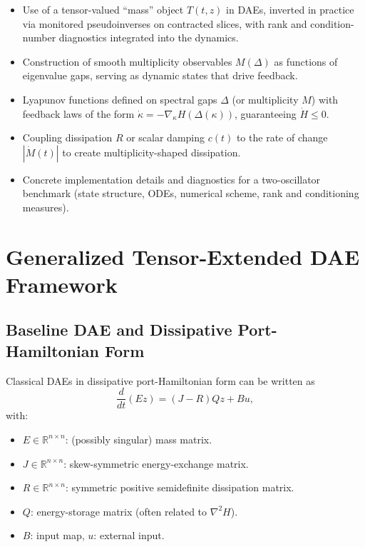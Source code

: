 \documentclass[11pt]{article}
\begin{document}
\begin{itemize}
  \item Use of a tensor-valued ``mass'' object $T(t,z)$ in DAEs, inverted in practice via monitored pseudoinverses on contracted slices, with rank and condition-number diagnostics integrated into the dynamics.
  \item Construction of smooth multiplicity observables $M(\Delta)$ as functions of eigenvalue gaps, serving as dynamic states that drive feedback.
  \item Lyapunov functions defined on spectral gaps $\Delta$ (or multiplicity $M$) with feedback laws of the form $\dot\kappa = -\nabla_\kappa H(\Delta(\kappa))$, guaranteeing $\dot H \le 0$.
  \item Coupling dissipation $R$ or scalar damping $c(t)$ to the rate of change $|\dot M(t)|$ to create multiplicity-shaped dissipation.
  \item Concrete implementation details and diagnostics for a two-oscillator benchmark (state structure, ODEs, numerical scheme, rank and conditioning measures).
\end{itemize}

\section{Generalized Tensor-Extended DAE Framework}

\subsection{Baseline DAE and Dissipative Port-Hamiltonian Form}

Classical DAEs in dissipative port-Hamiltonian form can be written as
\begin{equation}
  \frac{d}{dt}(E z) = (J - R) Q z + B u,
\end{equation}
with:
\begin{itemize}
  \item $E \in \mathbb{R}^{n\times n}$: (possibly singular) mass matrix.
  \item $J\in \mathbb{R}^{n\times n}$: skew-symmetric energy-exchange matrix.
  \item $R\in \mathbb{R}^{n\times n}$: symmetric positive semidefinite dissipation matrix.
  \item $Q$: energy-storage matrix (often related to $\nabla^2 H$).
  \item $B$: input map, $u$: external input.
\end{itemize}
\end{document}
